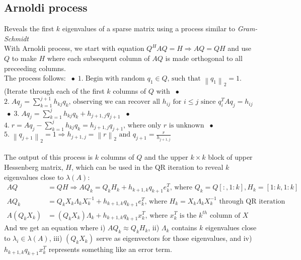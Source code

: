 \documentclass{article}
\newcommand{\norm}[2]{\left\lVert#1\right\rVert_#2}
\newcommand*\bspace{$\; \bullet \;$}
\begin{document}
\subsection{Arnoldi process}
Reveals the first $k$ eigenvalues of a sparse matrix using a process similar to \textit{Gram-Schmidt}\\
With Arnoldi process, we start with equation $Q^HAQ = H \Longrightarrow AQ = QH$ and use $Q$ to make $H$ where each subsequent column of $AQ$ is made orthogonal to all preceeding columns.\\
The process follows: \bspace $1. \; \textrm{Begin with random } q_1 \in Q \textrm{, such that } \norm{q_1}{2} = 1$. (Iterate through each of the first $k$ columns of $Q$ with \bspace $2. \; Aq_j = \sum_{k = 1}^{j+1} h_{kj}q_k \textrm{, observing we can recover all $h_{ij}$ for $i \leq j$ since } q_i^TAq_j = h_{ij}$ \bspace $3. \; Aq_j = \sum_{k = 1}^{j} h_{kj}q_k + h_{j+1, j}q_{j+1}$ \bspace $4. \; r = Aq_j - \sum_{k = 1}^{j} h_{kj}q_k = h_{j+1, j}q_{j+1} \textrm{, where only $r$ is unknown}$ \bspace $5. \; \norm{q_{j+1}}{2} = 1 \Longrightarrow h_{j+1, j} = \norm{r}{2} \textrm{ and } q_{j+1} = \frac{r}{h_{j+1, j}}$\\\\
The output of this process is $k$ columns of $Q$ and the upper $k \times k$ block of upper Hessenberg matrix, $H$, which can be used in the QR iteration to reveal $k$ eigenvalues close to $\lambda(A)$:
\begin{align*}
    AQ &= QH \Longrightarrow AQ_k = Q_kH_k + h_{k+1,k}q_{k+1}e_k^T \textrm{, where } Q_k = Q[:, 1:k], H_k = [1:k, 1:k]\\
    AQ_k &= Q_kX_k\Lambda_k X_k^{-1} + h_{k+1,k}q_{k+1}e_k^T \textrm{, where } H_k = X_k\Lambda_k X_k^{-1} \textrm{ through QR iteration}\\
    A(Q_kX_k) &= (Q_kX_k)\Lambda_k + h_{k+1,k}q_{k+1}x_k^T \textrm{, where } x_k^T \textrm{ is the $k^{th}$ column of } X
\end{align*}
And we get an equation where i) $AQ_k \approx Q_kH_k$, ii) $\Lambda_k$ contains $k$ eigenvalues close to $\lambda_i \in \lambda(A)$, iii) $(Q_kX_k)$ serve as eigenvectors for those eigenvalues, and iv) $h_{k+1,k}q_{k+1}x_k^T$ represents something like an error term.
\end{document}
